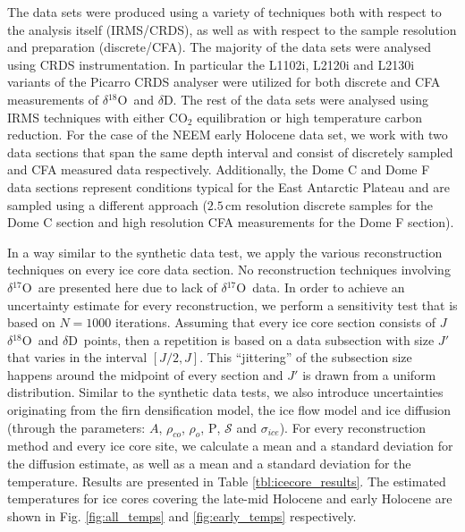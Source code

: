 \documentclass[11pt, draftcls, onecolumn]{IEEEtran} %
\numberwithin{equation}{section}
\numberwithin{table}{section}
\numberwithin{figure}{section}
\newcommand{\delOx}{$\delta{}^{18}\mathrm{O}$}
\newcommand{\delOxb}{$\delta{}^{17}\mathrm{O}$}
\newcommand{\delD}{$\delta\mathrm{D}$}
\begin{document}
The data sets were produced using a variety of techniques
both with respect to the analysis itself (IRMS/CRDS), as well as with respect to the sample resolution and preparation
(discrete/CFA). 
The majority of the data sets were analysed using CRDS instrumentation. In particular the L1102i, L2120i and L2130i
variants of the Picarro CRDS analyser were utilized for both discrete and CFA measurements of \delOx~and \delD.
The rest of the data sets were analysed using IRMS techniques with either $\mathrm{CO}_2$ equilibration or 
high temperature carbon reduction. 
For the case of the NEEM early Holocene data set, we work with two data sections that span the same 
depth interval and consist of discretely sampled and CFA measured data respectively.
Additionally, the Dome C and Dome F data sections represent conditions typical for the East Antarctic Plateau and are sampled
using a different approach ($2.5 \, \mathrm{cm}$ resolution discrete samples for the Dome C section and high resolution CFA measurements
for the Dome F section).

In a way similar to the synthetic data test, we apply the various reconstruction techniques on every ice core data
section. No reconstruction techniques involving \delOxb ~are presented here due to lack of 
\delOxb ~data. 
In order to achieve an uncertainty estimate for every reconstruction, we 
perform a sensitivity test that is based on $N = 1000$ iterations. 
Assuming that every ice core section 
consists of $J$ \delOx ~and \delD ~points, then a repetition is based on a 
data subsection with size $J'$ that varies in the interval $\left[ J/2, J \right]$. 
This ``jittering'' of the subsection size happens around the midpoint of every section and $J'$ is 
drawn from a uniform distribution. 
Similar to the synthetic data tests, we also introduce uncertainties originating from the firn densification model, the ice flow  model
and ice diffusion (through the parameters: $A$, $\rho_{co}$, $\rho_o$, $\mathrm{P}$, $\mathcal{S}$ and $\sigma_{ice}$).
For every reconstruction method and every ice core site, we
calculate a mean and a standard deviation for the diffusion estimate, as well as a mean and a standard 
deviation for the temperature. 
Results are presented in Table \ref{tbl:icecore_results}. 
The estimated temperatures for ice cores covering the late-mid Holocene and early Holocene are 
shown in Fig. \ref{fig:all_temps} and \ref{fig:early_temps} respectively.



\end{document}
